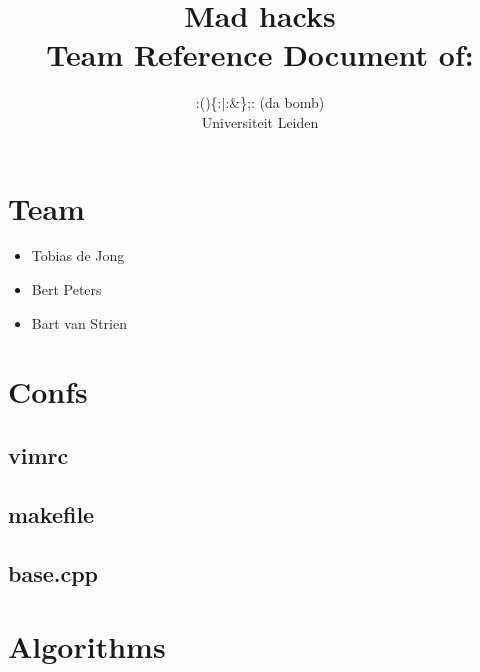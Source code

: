 \documentclass[10pt]{article}
\title{Mad hacks\\[1cm]
\small{Team Reference Document of:}}
\author{:()\{:$\vert$:\&\};: (da bomb)\\[1cm]
	\small{Universiteit Leiden}}
\begin{document}
\fontsize{10}{12}


\maketitle

\newpage

\tableofcontents

\section{Team}
\begin{itemize}
\item Tobias de Jong
\item Bert Peters
\item Bart van Strien
\end{itemize}

\section{Confs}

\subsection{vimrc}


\subsection{makefile}


\lstset{language=c++}

\subsection{base.cpp}


\section{Algorithms}
\end{document}

